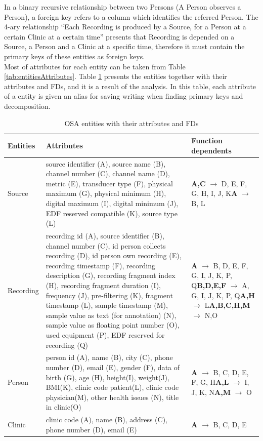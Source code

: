 In a binary recursive relationship between two Persons (A Person observes a Person), a foreign key refers to a column which identifies the referred Person. The 4-ary relationship “Each Recording is produced by a Source, for a Person at a certain Clinic at a certain time” presents that Recording is depended on a Source, a Person and a Clinic at a specific time, therefore it must contain the primary keys of these entities as foreign keys.\\
Most of attributes for each entity can be taken from Table \ref{tab:entitiesAttributes}. Table \ref{tab:EntitiesFDs} presents the entities together with their attributes and FDs, and it is a result of the analysis. In this table, each attribute of a entity is given an alias for saving writing when finding primary keys and decomposition. 
\begin{table}[ht]
\begin{center}
\begin{tabular}{ |p{1.5cm}||p{5cm}|p{6.5cm}|  }
 \hline
 Entities& Attributes& Function dependents\\
 \hline
 Source& source identifier (A), source name (B), channel number (C), channel name (D), metric (E), transducer type (F), physical maximum (G), physical minimum (H), digital maximum (I), digital minimum (J), EDF reserved compatible (K), source type (L)& \textbf{A,C} $\rightarrow$ D, E, F, G, H, I, J, K\newline \textbf{A} $\rightarrow$ B, L\\
 \hline
 Recording& recording id (A), source identifier (B), channel number (C), id person collects recording (D), id person own recording (E), recording timestamp (F), recording description (G), recording fragment index (H), recording fragment duration (I), frequency (J), pre-filtering (K), fragment timestamp (L), sample timestamp (M), sample value as text (for annotation) (N), sample value as floating point number (O), used equipment (P), EDF reserved for recording (Q)& \textbf{A} $\rightarrow$ B, D, E, F, G, I, J, K, P, Q\newline \textbf{B,D,E,F} $\rightarrow$ A, G, I, J, K, P, Q\newline \textbf{A,H} $\rightarrow$ L\newline \textbf{A,B,C,H,M} $\rightarrow$ N,O\\
 \hline
 Person& person id (A), name (B), city (C), phone number (D), email (E), gender (F), data of birth (G), age (H), height(I), weight(J), BMI(K), clinic code patient(L), clinic code physician(M), other health issues (N), title in clinic(O)& \textbf{A} $\rightarrow$ B, C, D, E, F, G, H\newline \textbf{A,L} $\rightarrow$ I, J, K, N\newline \textbf{A,M} $\rightarrow$ O\\
 \hline
 Clinic& clinic code (A), name (B), address (C), phone number (D), email (E)& \textbf{A} $\rightarrow$ B, C, D, E\\
 \hline
\end{tabular}
\end{center}
\caption{OSA entities with their attributes and FDs}
\label{tab:EntitiesFDs}
\end{table}
